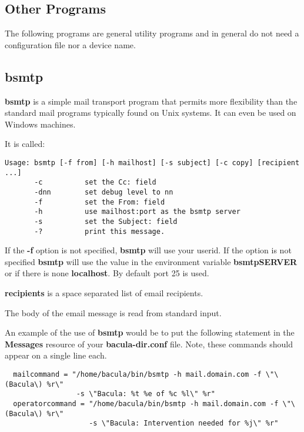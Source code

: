 \subsection*{Other Programs}

The following programs are general utility programs and in general do not need
a configuration file nor a device name. 

\subsection*{bsmtp}
\label{bsmtp}

{\bf bsmtp} is a simple mail transport program that permits more flexibility
than the standard mail programs typically found on Unix systems. It can even
be used on Windows machines. 

It is called: 

\footnotesize
\begin{verbatim}
Usage: bsmtp [-f from] [-h mailhost] [-s subject] [-c copy] [recipient ...]
       -c          set the Cc: field
       -dnn        set debug level to nn
       -f          set the From: field
       -h          use mailhost:port as the bsmtp server
       -s          set the Subject: field
       -?          print this message.
\end{verbatim}
\normalsize

If the {\bf -f} option is not specified, {\bf bsmtp} will use your userid. If
the option is not specified {\bf bsmtp} will use the value in the environment
variable {\bf bsmtpSERVER} or if there is none {\bf localhost}. By default
port 25 is used. 

{\bf recipients} is a space separated list of email recipients. 

The body of the email message is read from standard input. 

An example of the use of {\bf bsmtp} would be to put the following statement
in the {\bf Messages} resource of your {\bf bacula-dir.conf} file. Note, these
commands should appear on a single line each. 

\footnotesize
\begin{verbatim}
  mailcommand = "/home/bacula/bin/bsmtp -h mail.domain.com -f \"\(Bacula\) %r\"
                 -s \"Bacula: %t %e of %c %l\" %r"
  operatorcommand = "/home/bacula/bin/bsmtp -h mail.domain.com -f \"\(Bacula\) %r\"
                    -s \"Bacula: Intervention needed for %j\" %r"
\end{verbatim}
\normalsize

